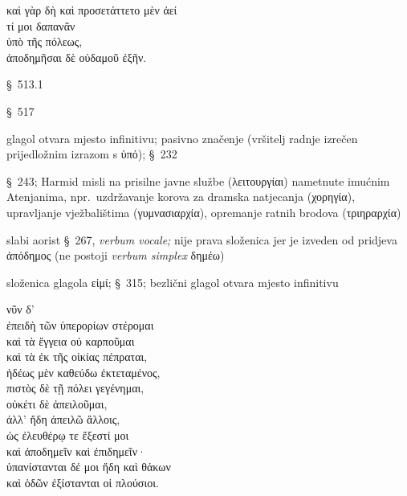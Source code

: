 {\large
\begin{greek}
καὶ γὰρ δὴ καὶ προσετάττετο μὲν ἀεί \\
\tabto{2em} τί μοι δαπανᾶν \\
\tabto{2em} ὑπὸ τῆς πόλεως, \\
ἀποδημῆσαι δὲ οὐδαμοῦ ἐξῆν.\\

\end{greek}
}

\begin{description}[noitemsep]
\item[καὶ\dots\ δὴ καὶ\dots] §~513.1
\item[γὰρ] §~517
\item[προσετάττετο] glagol otvara mjesto infinitivu; pasivno značenje (vršitelj radnje izrečen prijedložnim izrazom s ὑπό); §~232
\item[δαπανᾶν] §~243; Harmid misli na prisilne javne službe (λειτουργίαι) nametnute imućnim Atenjanima, npr.\ uzdržavanje korova za dramska natjecanja (χορηγία), upravljanje vježbalištima (γυμνασιαρχία), opremanje ratnih brodova (τριηραρχία)
\item[ἀποδημῆσαι] slabi aorist §~267, \textit{verbum vocale;} nije prava složenica jer je izveden od pridjeva ἀπόδημος (ne postoji \textit{verbum simplex} δημέω)
\item[ἐξῆν] složenica glagola εἰμί; §~315; bezlični glagol otvara mjesto infinitivu
\end{description}


{\large
\begin{greek}
\noindent νῦν δ' \\
ἐπειδὴ τῶν ὑπερορίων στέρομαι \\
\tabto{2em} καὶ τὰ ἔγγεια οὐ καρποῦμαι \\
\tabto{2em} καὶ τὰ ἐκ τῆς οἰκίας πέπραται, \\
ἡδέως μὲν καθεύδω ἐκτεταμένος, \\
πιστὸς δὲ τῇ πόλει γεγένημαι, \\
οὐκέτι δὲ ἀπειλοῦμαι, \\
ἀλλ' ἤδη ἀπειλῶ ἄλλοις, \\
ὡς ἐλευθέρῳ τε ἔξεστί μοι \\
\tabto{2em} καὶ ἀποδημεῖν καὶ ἐπιδημεῖν· \\
ὑπανίστανται δέ μοι ἤδη καὶ θάκων \\
καὶ ὁδῶν ἐξίστανται οἱ πλούσιοι.\\

\end{greek}
}

